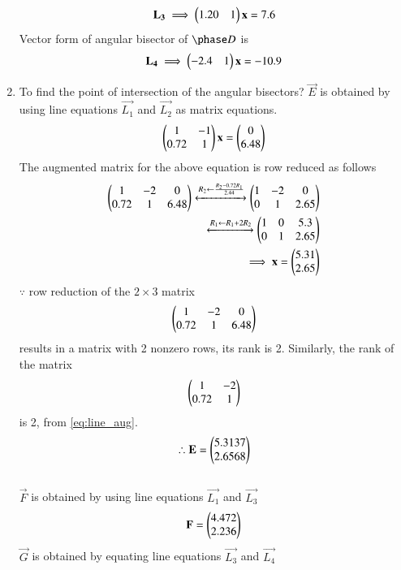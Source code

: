 \begin{enumerate}[label=\arabic*.,ref=\thesubsection.\theenumi]
\begin{align}
\label{eq:constr_c}
\mathbf{L_3} \implies \begin{pmatrix}1.20 & 1\end{pmatrix}\mathbf{x} = 7.6
\end{align}
Vector form of angular bisector of $\phase D$ is
\begin{align}
\label{eq:constr_d}
\mathbf{L_4} \implies \begin{pmatrix}-2.4 & 1\end{pmatrix}\mathbf{x} = -10.9
\end{align}
\item To find the point of intersection of the angular bisectors?
\solution
$\vec{E}$ is obtained by using line equations $\vec{L_1}$ and $\vec{L_2}$ as matrix equations.
\begin{align}
\begin{pmatrix}1 & -1\\0.72 & 1\end{pmatrix}\mathbf{x}=\begin{pmatrix}0\\6.48\end{pmatrix}
\end{align}
The augmented matrix for the above equation is row reduced as follows
\begin{align}
\begin{pmatrix}1 & -2 & 0\\0.72 & 1 & 6.48\end{pmatrix} 
\xleftrightarrow {R_2\leftarrow \frac{R_2-0.72R_1}{2.44}}\begin{pmatrix}1 & -2 & 0\\0 & 1 & 2.65\end{pmatrix} 
\\
\xleftrightarrow {R_1\leftarrow R_1 + 2R_2}\begin{pmatrix}1 & 0 & 5.3\\0 & 1 & 2.65\end{pmatrix} 
\label{eq:line_aug}
\\
\implies \mathbf{x}=\begin{pmatrix}5.31\\2.65\end{pmatrix}
\end{align}
%
$\because$ row reduction of the $2\times 3$ matrix
\begin{align}
\begin{pmatrix}1 & -2 & 0\\0.72 & 1 & 6.48\end{pmatrix} 
\end{align}
%
results in a matrix with 2 nonzero rows, its rank is 2.  Similarly, the rank of the matrix 
%
\begin{align}
\begin{pmatrix}1 & -2\\0.72 & 1\end{pmatrix} 
\end{align}
is 2, from \ref{eq:line_aug}. 
\\
$$\therefore \mathbf{E}=\begin{pmatrix}5.3137\\2.6568\end{pmatrix}$$
\\
$\vec{F}$ is obtained by using line equations $\vec{L_1}$ and $\vec{L_3}$
\begin{align}
\mathbf{F}=\begin{pmatrix}4.472\\2.236\end{pmatrix}
\end{align}
$\vec{G}$ is obtained by equating line equations $\vec{L_3}$ and $\vec{L_4}$

\end{enumerate}
